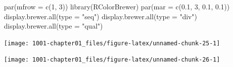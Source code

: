 \documentclass[
]{book}
\newenvironment{Shaded}{\begin{snugshade}}{\end{snugshade}}
\newcommand{\AttributeTok}[1]{\textcolor[rgb]{0.77,0.63,0.00}{#1}}
\newcommand{\CommentTok}[1]{\textcolor[rgb]{0.56,0.35,0.01}{\textit{#1}}}
\newcommand{\DecValTok}[1]{\textcolor[rgb]{0.00,0.00,0.81}{#1}}
\newcommand{\FloatTok}[1]{\textcolor[rgb]{0.00,0.00,0.81}{#1}}
\newcommand{\FunctionTok}[1]{\textcolor[rgb]{0.00,0.00,0.00}{#1}}
\newcommand{\NormalTok}[1]{#1}
\newcommand{\OtherTok}[1]{\textcolor[rgb]{0.56,0.35,0.01}{#1}}
\newcommand{\SpecialCharTok}[1]{\textcolor[rgb]{0.00,0.00,0.00}{#1}}
\newcommand{\StringTok}[1]{\textcolor[rgb]{0.31,0.60,0.02}{#1}}
\begin{document}
\begin{Shaded}
\begin{Highlighting}[]
\FunctionTok{par}\NormalTok{(}\AttributeTok{mfrow =} \FunctionTok{c}\NormalTok{(}\DecValTok{1}\NormalTok{, }\DecValTok{3}\NormalTok{))}
\FunctionTok{library}\NormalTok{(RColorBrewer)}
\FunctionTok{par}\NormalTok{(}\AttributeTok{mar =} \FunctionTok{c}\NormalTok{(}\FloatTok{0.1}\NormalTok{, }\DecValTok{3}\NormalTok{, }\FloatTok{0.1}\NormalTok{, }\FloatTok{0.1}\NormalTok{))}
\FunctionTok{display.brewer.all}\NormalTok{(}\AttributeTok{type =} \StringTok{"seq"}\NormalTok{)}
\FunctionTok{display.brewer.all}\NormalTok{(}\AttributeTok{type =} \StringTok{"div"}\NormalTok{)}
\FunctionTok{display.brewer.all}\NormalTok{(}\AttributeTok{type =} \StringTok{"qual"}\NormalTok{)}
\end{Highlighting}
\end{Shaded}

\begin{center}\texttt{[image: 1001-chapter01\_files/figure-latex/unnamed-chunk-25-1]} \end{center}

\begin{Shaded}
\end{Shaded}

\begin{center}\texttt{[image: 1001-chapter01\_files/figure-latex/unnamed-chunk-26-1]} \end{center}

\begin{Shaded}
\end{Shaded}
\end{document}
